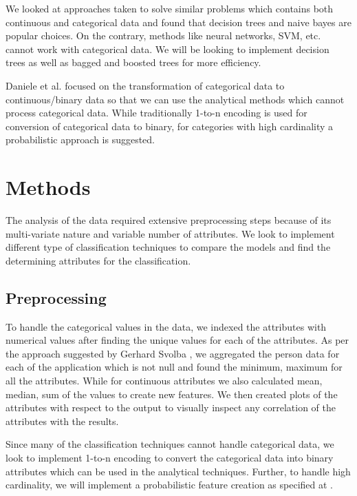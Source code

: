 \documentclass{article} %
\begin{document}
We looked at approaches taken to solve similar problems which contains both continuous and categorical data \cite{Matlab} and found that decision trees and naive bayes are popular choices. On the contrary, methods like neural networks, SVM, etc. cannot work with categorical data. We will be looking to implement decision trees as well as bagged and boosted trees for more efficiency. 

Daniele et al. \cite{HighCard} focused on the transformation of categorical data to continuous/binary data so that we can use the analytical methods which cannot process categorical data. While traditionally 1-to-n encoding is used for conversion of categorical data to binary, for categories with high cardinality a probabilistic approach is suggested.

\section{Methods}

The analysis of the data required extensive preprocessing steps because of its multi-variate nature and variable number of attributes. We look to implement different type of classification techniques to compare the models and find the determining attributes for the classification.

\subsection{Preprocessing}

To handle the categorical values in the data, we indexed the attributes with numerical values after finding the unique values for each of the attributes. As per the approach suggested by Gerhard Svolba \cite{OneRow}, we aggregated the person data for each of the application which is not null and found the minimum, maximum for all the attributes. While for continuous attributes we also calculated mean, median, sum of the values to create new features. We then created plots of the attributes with respect to the output to visually inspect any correlation of the attributes with the results.

Since many of the classification techniques cannot handle categorical data, we look to implement 1-to-n encoding to convert the categorical data into binary attributes which can be used in the analytical techniques. Further, to handle high cardinality, we will implement a probabilistic feature creation as specified at \cite{HighCard}. 
\end{document}
